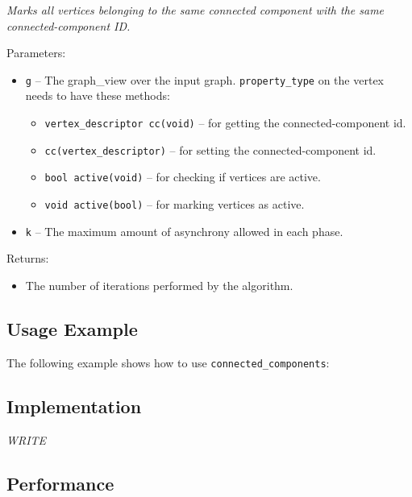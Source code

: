 \textit{
Marks all vertices belonging to the same connected component with the same connected-component ID.
}
\vspace{0.4cm}

Parameters:
\begin{itemize}
\item
\texttt{g} --
The graph\_view over the input graph. 
\texttt{property\_type}%
on the vertex needs to have these methods: 
\begin{itemize}
\item
\texttt{vertex\_descriptor cc(void)} --
for getting the connected-component id. 
\item
\texttt{cc(vertex\_descriptor)} --
for setting the connected-component id. 
\item
\texttt{bool active(void)} --
for checking if vertices are active. 
\item
\texttt{void active(bool)} --
for marking vertices as active.
\end{itemize}
\item
\texttt{k} --
The maximum amount of asynchrony allowed in each phase.
\end{itemize}

Returns:
\begin{itemize}
\item
The number of iterations performed by the algorithm. 
\end{itemize}

\subsection{Usage Example} \label{sec-conn-comp-alg-use}

The following example shows how to use 
\texttt{connected\_components}:


\subsection{Implementation} \label{sec-conn-comp-alg-impl}

\textit{WRITE}

\subsection{Performance} \label{sec-conn-comp-alg-perf}

